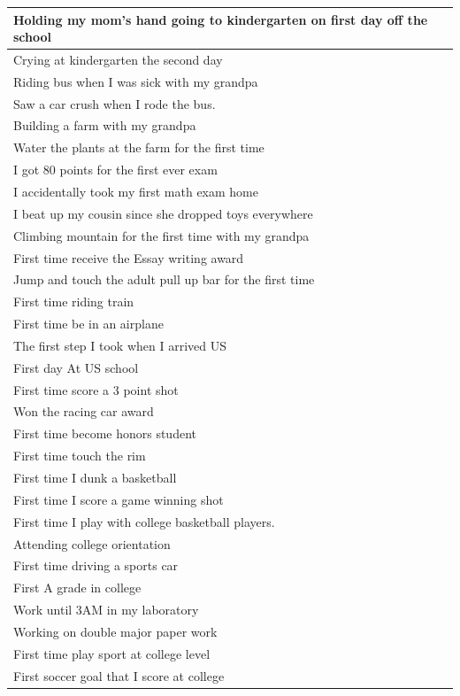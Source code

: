 \documentclass[
  .7em,
  letterpaper,
  DIV=11,
  numbers=noendperiod]{scrartcl}
\begin{document}
\begin{table}
\begin{tabular}{l}
\hline
Holding my mom’s hand going to kindergarten on first day off the school\\
\hline
Crying at kindergarten the second day\\
\hline
Riding bus when I was sick with my grandpa\\
\hline
Saw a car crush when I rode the bus.\\
\hline
Building a farm with my grandpa\\
\hline
Water the plants at the farm for the first time\\
\hline
I got 80 points for the first ever exam\\
\hline
I accidentally took my first math exam home\\
\hline
I beat up my cousin since she dropped toys everywhere\\
\hline
Climbing mountain for the first time with my grandpa\\
\hline
First time receive the Essay writing award\\
\hline
Jump and touch the adult pull up bar for the first time\\
\hline
First time riding train\\
\hline
First time be in an airplane\\
\hline
The first step I took when I arrived US\\
\hline
First day At US school\\
\hline
First time score a 3 point shot\\
\hline
Won the racing car award\\
\hline
First time become honors student\\
\hline
First time touch the rim\\
\hline
First time I dunk a basketball\\
\hline
First time I score a game winning shot\\
\hline
First time I play with college basketball players.\\
\hline
Attending college orientation\\
\hline
First time driving a sports car\\
\hline
First A grade in college\\
\hline
Work until 3AM in my laboratory\\
\hline
Working on double major paper work\\
\hline
First time play sport at college level\\
\hline
First soccer goal that I score at college\\

\end{tabular}
\end{table}
\end{document}
